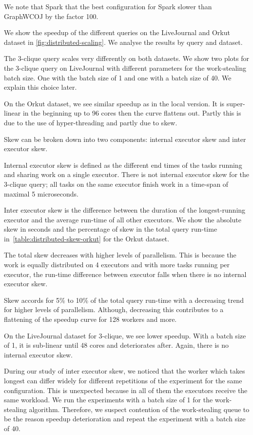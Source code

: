 We note that Spark that the best configuration for Spark slower than GraphWCOJ by the factor 100.

We show the speedup of the different queries on the LiveJournal and Orkut dataset in \cref{fig:distributed-scaling}.
We analyse the results by query and dataset.

The 3-clique query scales very differently on both datasets.
We show two plots for the 3-clique query on LiveJournal with different parameters for the work-stealing
batch size.
One with the batch size of 1 and one with a batch size of 40.
We explain this choice later.

On the Orkut dataset, we see similar speedup as in the local version.
It is super-linear in the beginning up to 96 cores then the curve flattens out.
Partly this is due to the use of hyper-threading and partly due to skew.

Skew can be broken down into two components: internal executor skew and inter executor skew.

Internal executor skew is defined as the different end times of the tasks running and sharing work on
a single executor.
There is not internal executor skew for the 3-clique query;
all tasks on the same executor finish work in a time-span of maximal 5 microseconds.

Inter executor skew is the difference between the duration of the longest-running executor and the average
run-time of all other executors.
We show the absolute skew in seconds and the percentage of skew in the total query run-time
in~\cref{table:distributed-skew-orkut} for the Orkut dataset.

The total skew decreases with higher levels of parallelism.
This is because the work is equally distributed on 4 executors and with more tasks running per executor,
the run-time difference between executor falls when there is no internal executor skew.

Skew accords for 5\% to 10\% of the total query run-time with a decreasing trend for higher levels of
parallelism.
Although, decreasing this contributes to a flattening of the speedup curve for 128 workers and more.

On the LiveJournal dataset for 3-clique, we see lower speedup.
With a batch size of 1, it is sub-linear until 48 cores and deteriorates after.
Again, there is no internal executor skew.

During our study of inter executor skew, we noticed that the worker which takes longest can differ widely
for different repetitions of the experiment for the same configuration.
This is unexpected because in all of them the executors receive the same workload.
We run the experiments with a batch size of 1 for the work-stealing algorithm.
Therefore, we suspect contention of the work-stealing queue to be the reason speedup deterioration and
repeat the experiment with a batch size of 40.

